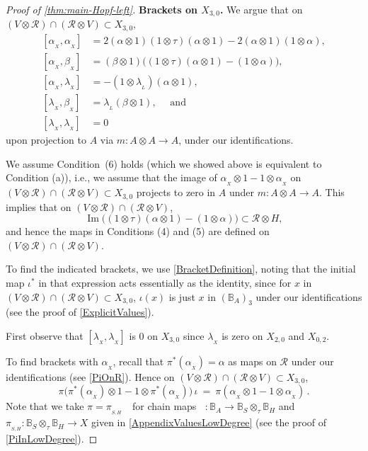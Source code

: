 \documentclass[11pt]{amsart}
\numberwithin{equation}{section}
\DeclareMathOperator{\Ima}{Im}
\newcommand{\X}{_X}
\newcommand{\alphax}{\alpha_{\X}}
\newcommand{\betax}{\beta_{\X}}
\newcommand{\lambdax}{\lambda_{\X}}
\newcommand{\R}{\mathcal{R}}
\newcommand{\BB}{\mathbb{B}} %
\DeclareMathOperator{\AW}{AW}
\DeclareMathOperator{\AWt}{\AW^{\tau}}
\renewcommand{\_}[1]{\mbox{$_{\left( #1 \right)}$}}
\newcommand{\ot}{\otimes}
\newcommand{\ott}{\otimes_{\tau}}
\begin{document}
{\begin{proof}[Proof of \cref{thm:main-Hopf-left}]
{\bf Brackets on $X_{3,0}$.}
We argue that
on $(V\ot \R)\cap (\R\ot V)\subset X_{3,0}$,
\begin{equation}\label{BracketsX30}
\begin{aligned}
  [ \alphax , \alphax ]
  &=
2 (\alpha\ot 1)(1\ot \tau)(\alpha\ot 1) 
-2(\alpha\ot 1)(1\ot \alpha),
\\ 
[\alphax, \betax]
  &=
  (\beta\ot 1) 
\big(
(1\ot \tau)(\alpha\ot 1) -(1\ot \alpha) \big),
\\
[\alphax, \lambdax]
&=
-(1 \ot\lambda_{_L}) (\alpha\ot 1),
\\
[\lambdax, \betax]
&= \lambda_{_L}(\beta \ot 1 ),
\quad\text{ and  }
  \\ [\lambdax, \lambdax]
  & = 0
\end{aligned}
\end{equation}
upon projection to $A$ via $m:A\ot A\rightarrow A$,
under our identifications. 

We assume Condition~(6) holds (which we showed above is equivalent to
Condition (a)), i.e., we assume that the image of 
$\alphax\ot 1 - 1\ot \alphax$
on $(V\ot \R)\cap (\R\ot V)\subset X_{3,0}$
projects to zero in $A$ under $m:A\ot A\rightarrow A$.
This implies that on $(V\ot \R)\cap (\R\ot V)$,
\begin{equation}\label{DefinedOn}
\Ima\big((1\ot\tau) (\alpha\ot 1) - (1\ot \alpha)\big)
\subset \R\ot H,
\end{equation}
and hence the maps in Conditions (4) and (5) are defined
on $(V\ot \R)\cap (\R\ot V)$.


To find the indicated brackets, we use \cref{BracketDefinition},
noting that the initial map $\iota^*$ in that expression
acts essentially as the identity,
since for $x$ in
$(V\ot \R)\cap (\R\ot V) \subset X_{3,0}$, 
$\iota(x)$ is just $x$ in $(\BB_A)_3$ under our identifications
 (see the proof of \cref{ExplicitValues}).
 
 
First observe that 
$[\lambdax,\lambdax]$ is $0$ on $X_{3,0}$
since $\lambdax$ is zero on $X_{2,0}$ and $X_{0,2}$.

To find brackets with $\alphax$, recall
that $\pi^*(\alphax)=\alpha$ 
as maps on $\R$
under our identifications (see \cref{PiOnR}).
Hence on $(V\ot \R)\cap (\R\ot V) \subset X_{3,0}$, 
 $$
\pi \big(\pi^*(\alphax)\ot 1-1\ot \pi^*(\alphax)\big)\, \iota
\ =\
\pi (\alphax\ot 1-1\ot \alphax)
\, . 
$$
Note that we take $\pi=\pi_{_{S,H}}\, \AWt$
for  chain maps $\AWt: \BB_A\rightarrow \BB_S\ott\BB_H$
and $\pi_{_{S,H}}: \BB_S\ott\BB_H\rightarrow X$
given in \cref {AppendixValuesLowDegree} 
(see the proof of \cref{PiInLowDegree}). 



\end{proof}}
\end{document}
